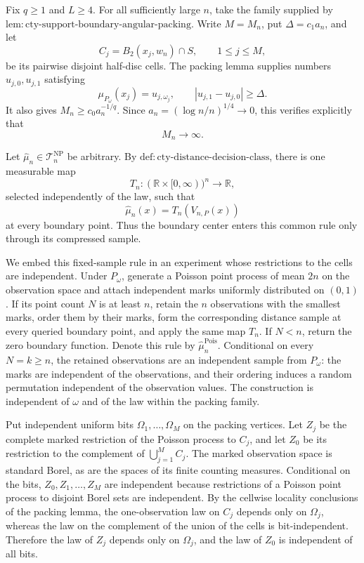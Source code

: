 Fix \(q\geq1\) and \(L\geq4\).  For all sufficiently large \(n\), take the family supplied by \(\mathrm{lem:cty\text{-}support\text{-}boundary\text{-}angular\text{-}packing}\).  Write \(M=M_n\), put \(\Delta=c_1a_n\), and let
\[
 C_j=B_2(x_j,w_n)\cap S,\qquad 1\leq j\leq M,
\]
be its pairwise disjoint half-disc cells.  The packing lemma supplies numbers \(u_{j,0},u_{j,1}\) satisfying
\[
 \mu_{P_\omega}(x_j)=u_{j,\omega_j},
 \qquad |u_{j,1}-u_{j,0}|\geq\Delta.
\]
It also gives \(M_n\geq c_0a_n^{-1/q}\).  Since \(a_n=(\log n/n)^{1/4}\to0\), this verifies explicitly that
\[
 M_n\longrightarrow\infty.
\]

Let \(\widehat\mu_n\in\mathcal T_n^{\mathrm{NP}}\) be arbitrary.  By \(\mathrm{def:cty\text{-}distance\text{-}decision\text{-}class}\), there is one measurable map
\[
 T_n:(\mathbb R\times[0,\infty))^n\longrightarrow\mathbb R,
\]
selected independently of the law, such that
\[
 \widehat\mu_n(x)=T_n(V_{n,P}(x))
\]
at every boundary point.  Thus the boundary center enters this common rule only through its compressed sample.

We embed this fixed-sample rule in an experiment whose restrictions to the cells are independent.  Under \(P_\omega\), generate a Poisson point process of mean \(2n\) on the observation space and attach independent marks uniformly distributed on \((0,1)\).  If its point count \(N\) is at least \(n\), retain the \(n\) observations with the smallest marks, order them by their marks, form the corresponding distance sample at every queried boundary point, and apply the same map \(T_n\).  If \(N<n\), return the zero boundary function.  Denote this rule by \(\widehat\mu_n^{\mathrm{Pois}}\).  Conditional on every \(N=k\geq n\), the retained observations are an independent sample from \(P_\omega\): the marks are independent of the observations, and their ordering induces a random permutation independent of the observation values.  The construction is independent of \(\omega\) and of the law within the packing family.

Put independent uniform bits \(\Omega_1,\ldots,\Omega_M\) on the packing vertices.  Let \(Z_j\) be the complete marked restriction of the Poisson process to \(C_j\), and let \(Z_0\) be its restriction to the complement of \(\bigcup_{j=1}^M C_j\).  The marked observation space is standard Borel, as are the spaces of its finite counting measures.  Conditional on the bits, \(Z_0,Z_1,\ldots,Z_M\) are independent because restrictions of a Poisson point process to disjoint Borel sets are independent.  By the cellwise locality conclusions of the packing lemma, the one-observation law on \(C_j\) depends only on \(\Omega_j\), whereas the law on the complement of the union of the cells is bit-independent.  Therefore the law of \(Z_j\) depends only on \(\Omega_j\), and the law of \(Z_0\) is independent of all bits.


